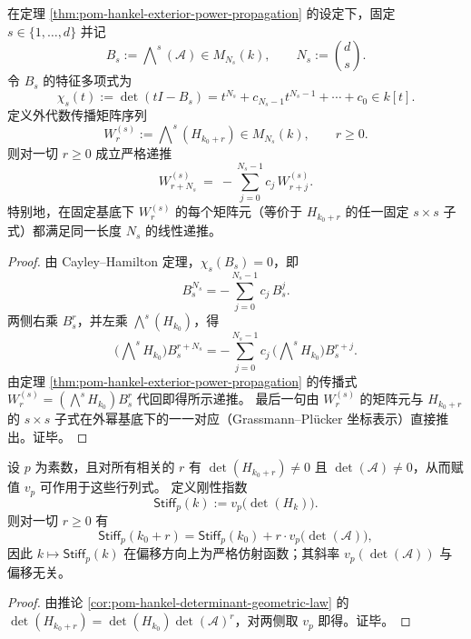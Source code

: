 \begin{corollary}[外代数综合征的有限记忆递推]\label{cor:pom-hankel-exterior-power-finite-memory}
在定理 \ref{thm:pom-hankel-exterior-power-propagation} 的设定下，固定 \(s\in\{1,\dots,d\}\) 并记
\[
B_s:=\bigwedge\nolimits^s(\mathcal A)\in M_{N_s}(k),
\qquad
N_s:=\binom{d}{s}.
\]
令 \(B_s\) 的特征多项式为
\[
\chi_s(t):=\det(tI-B_s)=t^{N_s}+c_{N_s-1}t^{N_s-1}+\cdots+c_0\in k[t].
\]
定义外代数传播矩阵序列
\[
W_r^{(s)}:=\bigwedge\nolimits^s(H_{k_0+r})\in M_{N_s}(k),\qquad r\ge 0.
\]
则对一切 \(r\ge 0\) 成立严格递推
\[
W_{r+N_s}^{(s)}\ =\ -\sum_{j=0}^{N_s-1} c_j\,W_{r+j}^{(s)}.
\]
特别地，在固定基底下 \(W_r^{(s)}\) 的每个矩阵元（等价于 \(H_{k_0+r}\) 的任一固定 \(s\times s\) 子式）都满足同一长度 \(N_s\) 的线性递推。
\end{corollary}
\begin{proof}
由 Cayley--Hamilton 定理，\(\chi_s(B_s)=0\)，即
\[
B_s^{N_s}=-\sum_{j=0}^{N_s-1}c_j\,B_s^{j}.
\]
两侧右乘 \(B_s^{r}\)，并左乘 \(\bigwedge^s(H_{k_0})\)，得
\[
\bigl(\bigwedge\nolimits^s H_{k_0}\bigr)B_s^{r+N_s}
=-\sum_{j=0}^{N_s-1}c_j\,\bigl(\bigwedge\nolimits^s H_{k_0}\bigr)B_s^{r+j}.
\]
由定理 \ref{thm:pom-hankel-exterior-power-propagation} 的传播式
\(
W_r^{(s)}=(\bigwedge^s H_{k_0})B_s^r
\)
代回即得所示递推。
最后一句由 \(W_r^{(s)}\) 的矩阵元与 \(H_{k_0+r}\) 的 \(s\times s\) 子式在外幂基底下的一一对应（Grassmann--Pl\"ucker 坐标表示）直接推出。证毕。
\end{proof}

\begin{corollary}\label{cor:pom-hankel-stiffness-affine-law}
设 \(p\) 为素数，且对所有相关的 \(r\) 有 \(\det(H_{k_0+r})\neq 0\) 且 \(\det(\mathcal A)\neq 0\)，从而赋值 \(v_p\) 可作用于这些行列式。
定义刚性指数
\[
\mathsf{Stiff}_p(k):=v_p\!\bigl(\det(H_k)\bigr).
\]
则对一切 \(r\ge 0\) 有
\[
\mathsf{Stiff}_p(k_0+r)=\mathsf{Stiff}_p(k_0)+r\cdot v_p\!\bigl(\det(\mathcal A)\bigr),
\]
因此 \(k\mapsto \mathsf{Stiff}_p(k)\) 在偏移方向上为严格仿射函数；其斜率 \(v_p(\det(\mathcal A))\) 与偏移无关。
\end{corollary}
\begin{proof}
由推论 \ref{cor:pom-hankel-determinant-geometric-law} 的 \(\det(H_{k_0+r})=\det(H_{k_0})\det(\mathcal A)^r\)，对两侧取 \(v_p\) 即得。证毕。
\end{proof}

